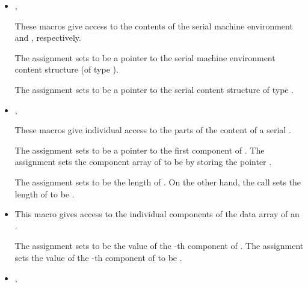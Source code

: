 \begin{itemize}

\item {}, 

      These macros give access to the contents of the serial 
      machine environment and , respectively.           
                                                               
      The assignment  sets       
       to be a pointer to the serial machine             
      environment content structure (of type ).

      The assignment  sets       
       to be a pointer to the serial  content    
      structure of type .

\item {}, 

      These macros give individual access to the parts of    
      the content of a serial .                        
                                                               
      The assignment  sets  to be     
      a pointer to the first component of . The assignment    
       sets the component array of  to     
      be  by storing the pointer .                   
                                                               
      The assignment  sets  to be     
      the length of . On the other hand, the call  
      sets the length of  to be .

\item {}

      This macro gives access to the individual components of the data
      array of an .

      The assignment  sets  to be the value of 
      the -th component of . The assignment    
      sets the value of the -th component of  to be .        

\item {}, 


\end{itemize}
